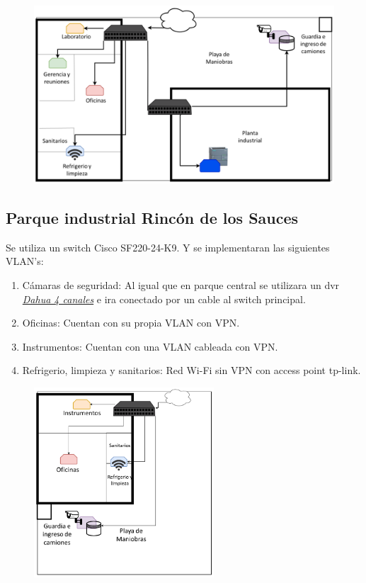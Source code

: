 \documentclass[11pt]{article}
\begin{document}
        \begin{figure}[H]
            \centering
            \includegraphics[width=\textwidth]{Figure/Planta_de_parque.png}
        \end{figure}
        

    \subsection{Parque industrial Rincón de los Sauces}

    Se utiliza un switch Cisco SF220-24-K9. Y se implementaran las siguientes VLAN's: 

    \begin{enumerate}
        \item Cámaras de seguridad: Al igual que en parque central se utilizara un dvr 
        \href{https://articulo.mercadolibre.com.ar/MLA-658974667-nvr-dvr-dahua-4-canales-penta-hdcvi-xvr-1a04-5-ch-5x1-qr-ps2-_JM#position=1&type=item&tracking_id=c1ba311d-e835-4420-9ba9-f01382834064}{\textit{Dahua 4 canales}} e ira conectado por un cable al switch principal.
        \item Oficinas: Cuentan con su propia VLAN con VPN.
        \item Instrumentos: Cuentan con una VLAN cableada con VPN.
        \item Refrigerio, limpieza y sanitarios: Red Wi-Fi sin VPN con access point tp-link. 
    \end{enumerate}

    \begin{figure}[H]
        \centering
        \includegraphics[width=0.6\textwidth]{Figure/Parque_Industrial.png}
    \end{figure}
\end{document}
